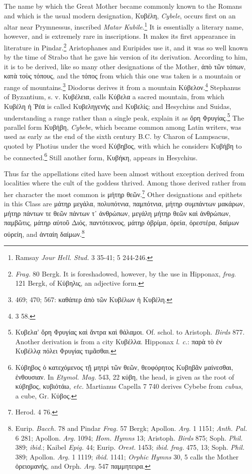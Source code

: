 \documentclass[a4paper, 11pt, oneside, polutonikogreek, english]{article}
\begin{document}
The name by which the Great Mother became commonly known to the Romans and which is the usual modern designation, Κυβέλη, \emph{Cybele}, occurs first on an altar near Prymnessus, inscribed \emph{Matar Kubile}.\footnote{Ramsay \emph{Jour Hell. Stud.} 3 35-41; 5 244-246.} It is essentially a literary name, however, and is extremely rare in inscriptions. It makes its first appearance in literature in Pindar.\footnote{\emph{Frag.} 80 Bergk. It is foreshadowed, however, by the use in Hipponax, \emph{frag.} 121 Bergk, of Κὑβηλις, an adjective form.} Aristophanes and Euripides use it, and it was so well known by the time of Strabo that he gave his version of its derivation. According to him, it is to be derived, like so many other designations of the Mother, ἀπὸ τῶν τόπων, κατὰ τοὺς τόπους, and the τόπος from which this one was taken is a mountain or range of mountains.\footnote{469; 470; 567: καθάπερ ἀπὸ τῶν Κυβέλων ἡ Κυβέλη.} Diodorus derives it from a mountain Κύβελον.\footnote{3 58.} Stephanus of Byzantium, s. v. Κυβέλεια, calls Κύβελα a sacred mountain, from which Κυβέλη ἡ Ῥέα is called Κυβεληγενής and Κυβελίς; and Hesychius and Suidas, understanding a range rather than a single peak, explain it as ὄρη Φρυγίας.\footnote{Κυβελα' ὄρη Φρυγίας καὶ ἄντρα καὶ θάλαμοι. Of. schol. to Aristoph. \emph{Birds} 877. Another derivation is from a city Κυβέλλα. Hipponax \emph{l. c.}: παρὰ τὸ ἐν Κυβέλλᾳ πόλει Φρυγίας τιμᾶσθαι.} The parallel form Κυβήβη, \emph{Cybebe}, which became common among Latin writers, was used as early as the end of the sixth century \textsc{B.C.} by Charon of Lampsacus, quoted by Photius under the word Κύβηβος, with which he considers Κυβήβη to be connected.\footnote{Κύβηβος ὁ κατεχόμενος τῇ μητρὶ τῶν θεῶν, θεοφόρητος Κυβηβᾶν μαίνεσθαι, ἐνθουσιαν. In \emph{Etymol. Mag.} 543, 22 κύβη, the head, is given as the root of κύβηβος, κυβιότάω, \emph{etc.} Martianus Capella 7 740 derives Cybebe from \emph{cubus}, a cube, Gr. Κύβος.} Still another form, Κυβήκη, appears in Hesychius.

Thus far the appellations cited have been almost without exception derived from localities where the cult of the goddess thrived. Among those derived rather from her character the most common is μήτηρ θεῶν.\footnote{Herod. 4 76.} Other designations and epithets in this Class are μάτηρ μεγάλα, πολυπότνια, παμπότνια, μήτηρ συμπάντων μακάρων, μήτηρ πάντων τε θεῶν πάντων τ᾽ ἀνθρώπων, μεγάλη μήτηρ θεῶν καὶ ἀνθρώπων, παμβῶτις, μάτηρ αὐτοῦ Διός, παντότεκνος, μάτηρ ὀβρίμα, ὀρεία, ὀρεστέρα, δαίμων οὐρείη, and ἀνταίη δαίμων.\footnote{Eurip. \emph{Bacch.} 78 and Pindar \emph{Frag.} 57 Bergk; Apollon. \emph{Arg.} 1 1151; \emph{Anth. Pal.} 6 281; Apollon. \emph{Arg.} 1094; \emph{Hom. Hymns} 13; Aristoph. \emph{Birds} 875; Soph. \emph{Phil.} 389; \emph{ibid.}; Kaibel \emph{Epig.} 44; Eurip. \emph{Orest.} 1453; \emph{ibid.} \emph{frag.} 475, 13; Soph. \emph{Phil.} 389; Apollon. \emph{Arg.} 1 1119; \emph{ibid.} 1141; \emph{Orphic Hymns} 30, 5 calls the Mother ὀρειομανής, and Orph. \emph{Arg.} 547 παμμητειρα.}
\end{document}
